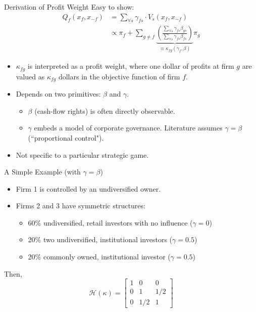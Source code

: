 \documentclass[handout,aspectratio=169,10pt]{beamer}
\begin{document}
\begin{frame}{Derivation of Profit Weight}
\small
Easy to show:
\begin{align*}
Q_{f}\left(x_{f}, x_{-f}\right) &=\sum_{\forall s} \gamma_{f s} \cdot V_{s}\left(x_{f}, x_{-f}\right)\\
&\propto \pi_{f}+\sum_{g \neq f} \underbrace{\left(\frac{\sum_{\forall s} \gamma_{f s} \beta_{g s}}{\sum_{\forall s} \gamma_{f s} \beta_{f s}}\right)}_{\equiv \kappa_{f g}\left(\gamma_{f}, \beta\right)} \pi_{g}
\end{align*}
\begin{itemize}
    \item $\kappa_{fg}$ is interpreted as a \alert{profit weight}, where one dollar of profits at firm $g$ are valued as $\kappa_{fg}$ dollars in the objective function of firm $f$.
    \item Depends on two primitives: $\beta$ and $\gamma$.
\begin{itemize}
    \item $\beta$ (cash-flow rights) is often directly observable.
    \item $\gamma$ embeds a model of corporate governance. Literature assumes $\gamma = \beta$ (``proportional control").
\end{itemize}
\item Not specific to a particular strategic game.
\end{itemize}
\end{frame}

\begin{frame}[plain,label=simpleexample]{A Simple Example (with $\gamma = \beta$)}
\begin{itemize}
\item Firm 1 is controlled by an undiversified owner.
\item Firms 2 and 3 have symmetric structures:
\begin{itemize}
\item 60\% undiversified, retail investors with no influence ($\gamma = 0$)
\item 20\% two undiversified, institutional investors  ($\gamma = 0.5$)
\item 20\% commonly owned, institutional investor  ($\gamma = 0.5$)
\end{itemize}
\end{itemize}
Then,
$$
 \mathcal{H}(\kappa)= \begin{bmatrix}1 & 0 & 0 \\ 0 & 1 & 1/2 \\ 0 & 1/2 & 1\end{bmatrix}  
$$

\end{frame}
\end{document}
